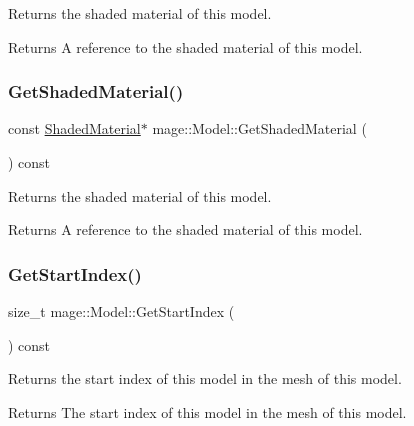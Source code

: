 Returns the shaded material of this model.

\begin{DoxyReturn}{Returns}
A reference to the shaded material of this model. 
\end{DoxyReturn}
\hypertarget{classmage_1_1_model_a84af7ad13b2bc1d8a51828a62fbaa4b0}{}\label{classmage_1_1_model_a84af7ad13b2bc1d8a51828a62fbaa4b0} 
\subsubsection{\texorpdfstring{Get\+Shaded\+Material()}{GetShadedMaterial()}\hspace{0.1cm}{\footnotesize\ttfamily [2/2]}}
{\footnotesize\ttfamily const \hyperlink{structmage_1_1_shaded_material}{Shaded\+Material}$\ast$ mage\+::\+Model\+::\+Get\+Shaded\+Material (\begin{DoxyParamCaption}{ }\end{DoxyParamCaption}) const}

Returns the shaded material of this model.

\begin{DoxyReturn}{Returns}
A reference to the shaded material of this model. 
\end{DoxyReturn}
\hypertarget{classmage_1_1_model_af17401dfd3e51f96dc0652a3aa3c4412}{}\label{classmage_1_1_model_af17401dfd3e51f96dc0652a3aa3c4412} 
\subsubsection{\texorpdfstring{Get\+Start\+Index()}{GetStartIndex()}}
{\footnotesize\ttfamily size\+\_\+t mage\+::\+Model\+::\+Get\+Start\+Index (\begin{DoxyParamCaption}{ }\end{DoxyParamCaption}) const}

Returns the start index of this model in the mesh of this model.

\begin{DoxyReturn}{Returns}
The start index of this model in the mesh of this model. 
\end{DoxyReturn}
\hypertarget{classmage_1_1_model_a563515c64ec39cfcda9f6ca37576391b}{}\label{classmage_1_1_model_a563515c64ec39cfcda9f6ca37576391b} 
